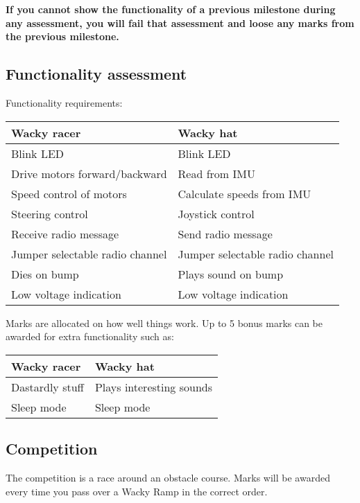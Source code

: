 \documentclass[11pt, a4paper]{article}
\begin{document}
\textbf{If you cannot show the functionality of a previous milestone
  during any assessment, you will fail that assessment and loose any
  marks from the previous milestone.}


\subsection{Functionality assessment}

Functionality requirements:
%
\begin{flushleft}
  \begin{tabular}{l|l}
    Wacky racer & Wacky hat \\ \hline \hline
    Blink LED                      & Blink LED \\
    Drive motors forward/backward  & Read from IMU \\
    Speed control of motors        & Calculate speeds from IMU \\
    Steering control               & Joystick control \\
    Receive radio message          & Send radio message \\
    Jumper selectable radio channel & Jumper selectable radio channel  \\
    Dies on bump                   & Plays sound on bump \\
    Low voltage indication         & Low voltage indication \\
  \end{tabular}
\end{flushleft}
%
Marks are allocated on how well things work.  Up to 5 bonus marks can
be awarded for extra functionality such as:
%
\begin{flushleft}
  \begin{tabular}{l|l}
    Wacky racer                & Wacky hat \\ \hline \hline
    Dastardly stuff            & Plays interesting sounds \\
    Sleep mode                 & Sleep mode \\
  \end{tabular}
\end{flushleft}


\subsection{Competition}

The competition is a race around an obstacle course.  Marks will be
awarded every time you pass over a Wacky Ramp in the correct order.
\end{document}
